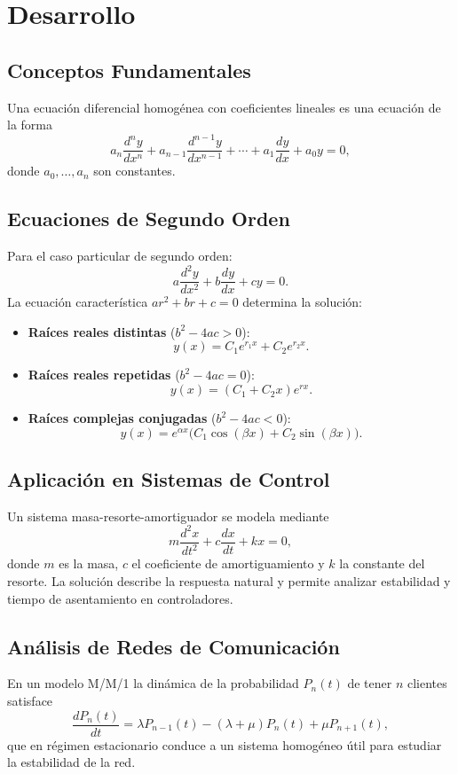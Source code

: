 \section{Desarrollo}

\subsection{Conceptos Fundamentales}

Una ecuación diferencial homogénea con coeficientes lineales es una ecuación de la forma
\[
a_n\frac{d^n y}{dx^n}+a_{n-1}\frac{d^{n-1}y}{dx^{n-1}}+\cdots+a_1\frac{dy}{dx}+a_0y=0,
\]
donde $a_0,\dots,a_n$ son constantes.

\subsection{Ecuaciones de Segundo Orden}

Para el caso particular de segundo orden:
\[
a\frac{d^2y}{dx^2}+b\frac{dy}{dx}+cy=0.
\]
La ecuación característica $ar^2+br+c=0$ determina la solución:

\begin{itemize}
\item \textbf{Raíces reales distintas} ($b^2-4ac>0$):
\[
y(x)=C_1e^{r_1x}+C_2e^{r_2x}.
\]

\item \textbf{Raíces reales repetidas} ($b^2-4ac=0$):
\[
y(x)=(C_1+C_2x)e^{rx}.
\]

\item \textbf{Raíces complejas conjugadas} ($b^2-4ac<0$):
\[
y(x)=e^{\alpha x}\bigl(C_1\cos(\beta x)+C_2\sin(\beta x)\bigr).
\]
\end{itemize}

\subsection{Aplicación en Sistemas de Control}

Un sistema masa-resorte-amortiguador se modela mediante
\[
m\frac{d^2x}{dt^2}+c\frac{dx}{dt}+kx=0,
\]
donde $m$ es la masa, $c$ el coeficiente de amortiguamiento y $k$ la constante del resorte. La solución describe la respuesta natural y permite analizar estabilidad y tiempo de asentamiento en controladores.

\subsection{Análisis de Redes de Comunicación}

En un modelo M/M/1 la dinámica de la probabilidad $P_n(t)$ de tener $n$ clientes satisface
\[
\frac{dP_n(t)}{dt}=\lambda P_{n-1}(t)-(\lambda+\mu)P_n(t)+\mu P_{n+1}(t),
\]
que en régimen estacionario conduce a un sistema homogéneo útil para estudiar la estabilidad de la red.